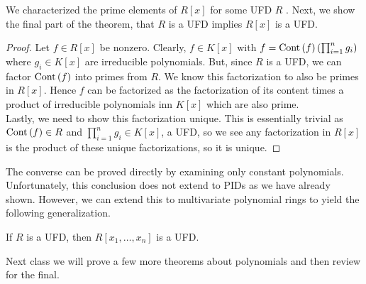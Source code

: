 \begin{recall}
	We characterized the prime elements of \(R\left[ x \right] \) for some UFD \(R\) . Next, we show the final part of the theorem, that \(R\) is a UFD implies \(R\left[ x \right] \) is a UFD.
\end{recall}
\begin{proof}
	Let \(f \in R\left[ x \right] \) be nonzero. Clearly, \(f \in K\left[ x \right] \) with \(f = \operatorname{Cont}\left( f \right) \left( \prod_{i= 1}^{n} g_{i}  \right) \) where \(g_{i} \in K\left[ x \right] \) are irreducible polynomials. But, since \(R\) is a UFD, we can factor \(\operatorname{Cont}\left( f \right) \) into primes from \(R\). We know this factorization to also be primes in \(R\left[ x \right] \). Hence \(f\) can be factorized as the factorization of its content times a product of irreducible polynomials inn \(K\left[ x \right] \) which are also prime.\\
	Lastly, we need to show this factorization unique. This is essentially trivial as \(\operatorname{Cont}\left( f \right) \in R\) and \(\prod_{i= 1}^{n} g_{i} \in K\left[ x \right]  \), a UFD, so we see any factorization in \(R\left[ x \right] \) is the product of these unique factorizations, so it is unique.
\end{proof}
The converse can be proved directly by examining only constant polynomials.\\
Unfortunately, this conclusion does not extend to PIDs as we have already shown. However, we can extend this to multivariate polynomial rings to yield the following generalization.
\begin{corollary}
	If \(R\) is a UFD, then \(R\left[ x_1, \ldots, x_{n} \right] \) is a UFD.
\end{corollary}

Next class we will prove a few more theorems about polynomials and then review for the final.
